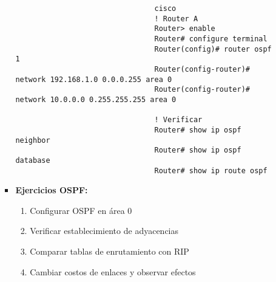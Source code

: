 \documentclass[12pt]{amsart}
\begin{document}
\begin{enumerate}
\begin{enumerate}
\begin{itemize}
							\begin{verbatim}
								cisco
								! Router A
								Router> enable
								Router# configure terminal
								Router(config)# router ospf 1
								Router(config-router)# network 192.168.1.0 0.0.0.255 area 0
								Router(config-router)# network 10.0.0.0 0.255.255.255 area 0
								
								! Verificar
								Router# show ip ospf neighbor
								Router# show ip ospf database
								Router# show ip route ospf
							\end{verbatim}

						\item \textbf{Ejercicios OSPF:}
							\begin{enumerate}
								\medskip
								\item Configurar OSPF en área 0
								\medskip
								
								\item Verificar establecimiento de adyacencias
								\medskip
		
								\item Comparar tablas de enrutamiento con RIP
								\medskip
		
								\item Cambiar costos de enlaces y observar efectos
								\medskip
							\end{enumerate}
					\end{itemize}		

					\bigskip\bigskip

			\end{enumerate}
		\bigskip\bigskip
		

		
	\end{enumerate}
	
\end{document}
